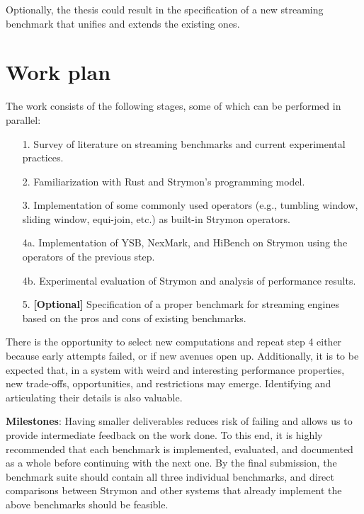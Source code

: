 \documentclass[a4paper,10pt,parskip=half]{scrartcl}
\begin{document}
Optionally, the thesis could result in the specification of a new streaming benchmark that unifies and extends the existing ones.\\

\printbibliography[heading=none]


\section{Work plan}

The work consists of the following stages, some of which can be performed in
parallel:

\begin{itemize}
  \item[1.] Survey of literature on streaming benchmarks and current experimental practices. 
 
  \item[2.] Familiarization with Rust and Strymon's programming model.

  \item[3.] Implementation of some commonly used operators (e.g., tumbling window, sliding window, equi-join, etc.) as built-in Strymon operators.

  \item[4a.] Implementation of YSB, NexMark, and HiBench on Strymon using the operators of the previous step.
  \item[4b.] Experimental evaluation of Strymon and analysis of performance results.

  \item[5.] \textbf{[Optional]} Specification of a proper benchmark for streaming engines based on the pros and cons of existing benchmarks.
  
\end{itemize}

There is the opportunity to select new computations and repeat step 4 either
because early attempts failed, or if new avenues open up.  Additionally, it is
to be expected that, in a system with weird and interesting performance
properties, new trade-offs, opportunities, and restrictions may emerge.
Identifying and articulating their details is also valuable.

\textbf{Milestones}: Having smaller deliverables reduces risk of failing and allows us to provide intermediate feedback on the work done.
To this end, it is highly recommended that each benchmark is implemented, evaluated, and documented as a whole before continuing with the next one. 
By the final submission, the benchmark suite should contain all three individual benchmarks, and direct comparisons between Strymon and other systems that already implement the above benchmarks should be feasible.
\end{document}
